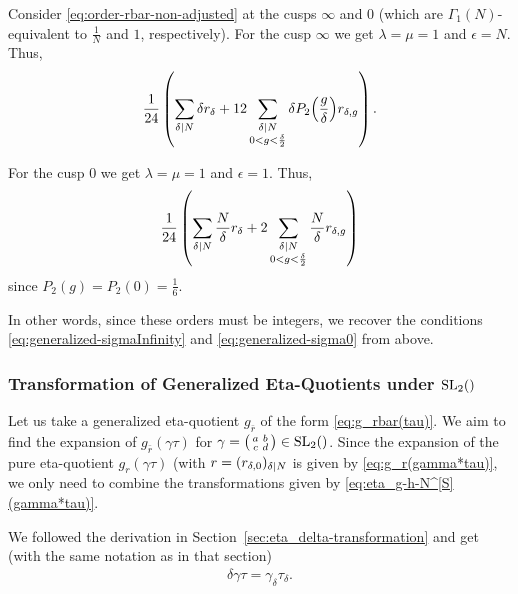 \documentclass{article}
\begin{document}
Consider \eqref{eq:order-rbar-non-adjusted} at the cusps $\infty$ and
$0$ (which are $\Gamma_1(N)$-equivalent to $\frac{1}{N}$ and $1$,
respectively).
%
For the cusp $\infty$ we get $\lambda=\mu=1$ and $\epsilon=N$. Thus,
\begin{gather}
  \frac{1}{24}
  \left(
    \sum_{\delta \mid N} \delta r_\delta
    +
    12 \sum_{\substack{\delta \mid N\\0 < g < \frac{\delta}{2}}}
    \delta
    P_2\Bigl(\frac{g}{\delta}\Bigr)r_{\delta,g}
  \right).
  \label{eq:modularGamma1-sigmaInfinity}
\end{gather}

For the cusp $0$ we get $\lambda=\mu=1$ and $\epsilon=1$. Thus,
%
\begin{gather}
  \frac{1}{24}
  \left(
    \sum_{\delta \mid N} \frac{N}{\delta} r_\delta
    +
    2 \sum_{\substack{\delta \mid N\\0 < g < \frac{\delta}{2}}}
    \frac{N}{\delta} r_{\delta,g}
  \right)
  \label{eq:modularGamma1-sigma0}
\end{gather}
since $P_2(g)=P_2(0)=\frac{1}{6}$.


In other words, since these orders must be integers, we recover the
conditions \ref{eq:generalized-sigmaInfinity} and
\ref{eq:generalized-sigma0} from above.







\subsubsection{Transformation of Generalized Eta-Quotients under $\SL2Z$}

Let us take a generalized eta-quotient $g_{\bar{r}}$ of the form
\eqref{eq:g_rbar(tau)}. We aim to find the expansion of
$g_{\bar{r}}(\gamma\tau)$ for
$\gamma = \left(\begin{smallmatrix}a&b\\c&d\end{smallmatrix}\right)
\in \SL2Z$. Since the expansion of the pure eta-quotient
$g_r(\gamma\tau)$ (with $r=(r_{\delta,0})_{\delta \mid N}$ is
given by \eqref{eq:g_r(gamma*tau)}, we only need to combine the
transformations given by \eqref{eq:eta_g-h-N^[S](gamma*tau)}.

We followed the derivation in
Section~\ref{sec:eta_delta-transformation} and get (with the same
notation as in that section)
\begin{gather*}
  \delta\gamma\tau = \gamma_\delta \tau_\delta.
\end{gather*}
\end{document}
